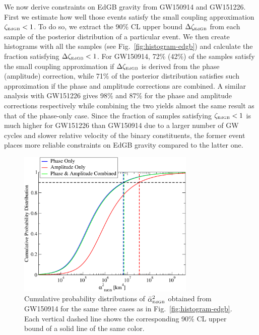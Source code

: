 \documentclass[prd,twocolumn,nofootinbib]{revtex4-1}
\newcommand{\EDGB}{{\mbox{\tiny EdGB}}}
\begin{document}
We now derive constraints on EdGB gravity from GW150914 and GW151226. First we estimate how well those events satisfy the small coupling approximation $\zeta_{\EDGB}<1$. To do so, we extract the 90\% CL upper bound $\Delta\zeta_{\EDGB}$ from each sample of the posterior distribution of a particular event. We then create histograms with all the samples (see Fig.~\ref{fig:histogram-edgb}) and calculate the fraction satisfying $\Delta\zeta_{\EDGB}<1$.  For GW150914, 72\% (42\%) of the samples satisfy the small coupling approximation if $\Delta\zeta_{\EDGB}$ is derived from the phase (amplitude) correction, while 71\% of the posterior distribution satisfies such approximation if the phase and amplitude corrections are combined. A similar analysis with GW151226 gives 98\% and 87\% for the phase and amplitude corrections respectively while combining the two yields almost the same result as that of the phase-only case. Since the fraction of samples satisfying $\zeta_{\EDGB}<1$ is much higher for GW151226 than GW150914 due to a larger number of GW cycles and slower relative velocity of the binary constituents, the former event places more reliable constraints on EdGB gravity compared to the latter one.


\begin{figure}[htb]
\includegraphics[width=8.5cm]{edgb-gw150914.pdf}
\caption{Cumulative probability distributions of $\bar{\alpha}^2_{\EDGB}$ obtained from GW150914 for the same three cases as in Fig.~\ref{fig:histogram-edgb}. Each vertical dashed line shows the corresponding 90\% CL upper bound of a solid line of the same color.}
\label{fig:pdf-edgb}
\end{figure}
\end{document}

